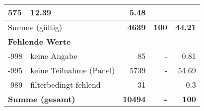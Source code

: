 \begin{longtable}{lXrrr}
       \num{575} &
       \num[round-mode=places,round-precision=2]{12.39} &
         \num[round-mode=places,round-precision=2]{5.48} \\
     \midrule
     \multicolumn{2}{l}{Summe (gültig)} &
       \textbf{\num{4639}} &
     \textbf{\num{100}} &
       \textbf{\num[round-mode=places,round-precision=2]{44.21}} \\
     \multicolumn{5}{l}{\textbf{Fehlende Werte}}\\
       -998 &
       keine Angabe &
         \num{85} &
        - &
         \num[round-mode=places,round-precision=2]{0.81} \\
       -995 &
       keine Teilnahme (Panel) &
         \num{5739} &
        - &
         \num[round-mode=places,round-precision=2]{54.69} \\
       -989 &
       filterbedingt fehlend &
         \num{31} &
        - &
         \num[round-mode=places,round-precision=2]{0.3} \\
     \midrule
     \multicolumn{2}{l}{\textbf{Summe (gesamt)}} &
          \textbf{\num{10494}} &
        \textbf{-} &
        \textbf{\num{100}} \\
     \bottomrule
     \end{longtable}
     
